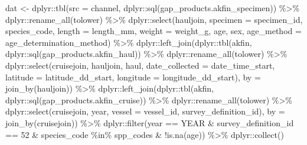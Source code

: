 \documentclass[
  letterpaper,
  oneside,
  open=any]{scrbook}
\newenvironment{Shaded}{\begin{snugshade}}{\end{snugshade}}
\newcommand{\AttributeTok}[1]{\textcolor[rgb]{0.40,0.45,0.13}{#1}}
\newcommand{\DecValTok}[1]{\textcolor[rgb]{0.68,0.00,0.00}{#1}}
\newcommand{\FunctionTok}[1]{\textcolor[rgb]{0.28,0.35,0.67}{#1}}
\newcommand{\NormalTok}[1]{\textcolor[rgb]{0.00,0.23,0.31}{#1}}
\newcommand{\OtherTok}[1]{\textcolor[rgb]{0.00,0.23,0.31}{#1}}
\newcommand{\SpecialCharTok}[1]{\textcolor[rgb]{0.37,0.37,0.37}{#1}}
\newcommand{\StringTok}[1]{\textcolor[rgb]{0.13,0.47,0.30}{#1}}
\begin{document}
\begin{Shaded}
\begin{Highlighting}[]
\NormalTok{dat }\OtherTok{\textless{}{-}}\NormalTok{ dplyr}\SpecialCharTok{::}\FunctionTok{tbl}\NormalTok{(}\AttributeTok{src =}\NormalTok{ channel, dplyr}\SpecialCharTok{::}\FunctionTok{sql}\NormalTok{(}\StringTok{\textquotesingle{}gap\_products.akfin\_specimen\textquotesingle{}}\NormalTok{)) }\SpecialCharTok{\%\textgreater{}\%} 
\NormalTok{    dplyr}\SpecialCharTok{::}\FunctionTok{rename\_all}\NormalTok{(tolower) }\SpecialCharTok{\%\textgreater{}\%} 
\NormalTok{    dplyr}\SpecialCharTok{::}\FunctionTok{select}\NormalTok{(hauljoin, }\AttributeTok{specimen =}\NormalTok{ specimen\_id, species\_code, }\AttributeTok{length =}\NormalTok{ length\_mm, }
                  \AttributeTok{weight =}\NormalTok{ weight\_g, age, sex, }\AttributeTok{age\_method =}\NormalTok{ age\_determination\_method) }\SpecialCharTok{\%\textgreater{}\%} 
\NormalTok{    dplyr}\SpecialCharTok{::}\FunctionTok{left\_join}\NormalTok{(dplyr}\SpecialCharTok{::}\FunctionTok{tbl}\NormalTok{(akfin, dplyr}\SpecialCharTok{::}\FunctionTok{sql}\NormalTok{(}\StringTok{\textquotesingle{}gap\_products.akfin\_haul\textquotesingle{}}\NormalTok{)) }\SpecialCharTok{\%\textgreater{}\%}
\NormalTok{                       dplyr}\SpecialCharTok{::}\FunctionTok{rename\_all}\NormalTok{(tolower) }\SpecialCharTok{\%\textgreater{}\%} 
\NormalTok{                       dplyr}\SpecialCharTok{::}\FunctionTok{select}\NormalTok{(cruisejoin, hauljoin, haul, }\AttributeTok{date\_collected =}\NormalTok{ date\_time\_start, }
                                     \AttributeTok{latitude =}\NormalTok{ latitude\_dd\_start, }\AttributeTok{longitude =}\NormalTok{ longitude\_dd\_start),}
                     \AttributeTok{by =} \FunctionTok{join\_by}\NormalTok{(hauljoin)) }\SpecialCharTok{\%\textgreater{}\%} 
\NormalTok{    dplyr}\SpecialCharTok{::}\FunctionTok{left\_join}\NormalTok{(dplyr}\SpecialCharTok{::}\FunctionTok{tbl}\NormalTok{(akfin, dplyr}\SpecialCharTok{::}\FunctionTok{sql}\NormalTok{(}\StringTok{\textquotesingle{}gap\_products.akfin\_cruise\textquotesingle{}}\NormalTok{)) }\SpecialCharTok{\%\textgreater{}\%}
\NormalTok{                       dplyr}\SpecialCharTok{::}\FunctionTok{rename\_all}\NormalTok{(tolower) }\SpecialCharTok{\%\textgreater{}\%} 
\NormalTok{                       dplyr}\SpecialCharTok{::}\FunctionTok{select}\NormalTok{(cruisejoin, year, }\AttributeTok{vessel =}\NormalTok{ vessel\_id, survey\_definition\_id),}
                     \AttributeTok{by =} \FunctionTok{join\_by}\NormalTok{(cruisejoin)) }\SpecialCharTok{\%\textgreater{}\%} 
\NormalTok{    dplyr}\SpecialCharTok{::}\FunctionTok{filter}\NormalTok{(year }\SpecialCharTok{==}\NormalTok{ YEAR }\SpecialCharTok{\&}
\NormalTok{             survey\_definition\_id }\SpecialCharTok{==} \DecValTok{52} \SpecialCharTok{\&} 
\NormalTok{             species\_code }\SpecialCharTok{\%in\%}\NormalTok{ spp\_codes }\SpecialCharTok{\&}
             \SpecialCharTok{!}\FunctionTok{is.na}\NormalTok{(age)) }\SpecialCharTok{\%\textgreater{}\%} 
\NormalTok{    dplyr}\SpecialCharTok{::}\FunctionTok{collect}\NormalTok{()}
\end{Highlighting}
\end{Shaded}
\end{document}
